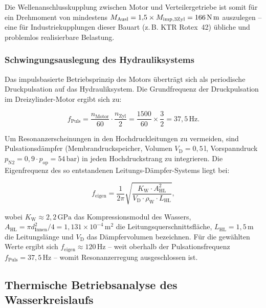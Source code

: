 ﻿\documentclass[a4paper,12pt]{article}
\begin{document}
Die Wellenanschlusskupplung zwischen Motor und Verteilergetriebe ist somit
für ein Drehmoment von mindestens $M_\text{Ausl} = 1{,}5 \times M_\text{imp,3Zyl}
= 166\,\text{N\,m}$ auszulegen -- eine für Industriekupplungen dieser Bauart
(z.\,B. KTR Rotex~42) übliche und problemlos realisierbare Belastung.

\subsubsection{Schwingungsauslegung des Hydrauliksystems}

Das impulsbasierte Betriebsprinzip des Motors überträgt sich als periodische
Druckpulsation auf das Hydrauliksystem. Die Grundfrequenz der Druckpulsation
im Dreizylinder-Motor ergibt sich zu:

\begin{equation}
  f_\text{Puls} = \frac{n_\text{Motor}}{60} \cdot \frac{n_\text{Zyl}}{2}
                = \frac{1500}{60} \times \frac{3}{2}
                = 37{,}5\,\text{Hz}.
  \label{eq:f_puls}
\end{equation}

Um Resonanzerscheinungen in den Hochdruckleitungen zu vermeiden, sind
Pulsationsdämpfer (Membrandruckspeicher, Volumen $V_\text{D} = 0{,}5\,\text{l}$,
Vorspanndruck $p_\text{N2} = 0{,}9 \cdot p_\text{op} = 54\,\text{bar}$) in
jeden Hochdruckstrang zu integrieren. Die Eigenfrequenz des so entstandenen
Leitungs-Dämpfer-Systems liegt bei:

\begin{equation}
  f_\text{eigen}
    = \frac{1}{2\pi}\sqrt{\frac{K_\text{W} \cdot A_\text{HL}^2}{V_\text{D} \cdot \rho_\text{W} \cdot L_\text{HL}}},
  \label{eq:f_eigen}
\end{equation}

wobei $K_\text{W} \approx 2{,}2\,\text{GPa}$ das Kompressionsmodul des Wassers,
$A_\text{HL} = \pi d_\text{Innen}^2/4 = 1{,}131 \times 10^{-4}\,\text{m}^2$
die Leitungsquerschnittsfläche, $L_\text{HL} = 1{,}5\,\text{m}$ die Leitungslänge
und $V_\text{D}$ das Dämpfervolumen bezeichnen. Für die gewählten Werte ergibt
sich $f_\text{eigen} \approx 120\,\text{Hz}$ -- weit oberhalb der
Pulsationsfrequenz $f_\text{Puls} = 37{,}5\,\text{Hz}$ -- womit
Resonanzerregung ausgeschlossen ist.

\subsection{Thermische Betriebsanalyse des Wasserkreislaufs}
\end{document}
